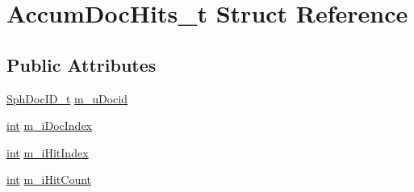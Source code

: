 \hypertarget{structAccumDocHits__t}{\section{Accum\-Doc\-Hits\-\_\-t Struct Reference}
\label{structAccumDocHits__t}
}
\subsection*{Public Attributes}
\begin{DoxyCompactItemize}
\item 
\hyperlink{sphinx_8h_a3176771631c12a9e4897272003e6b447}{Sph\-Doc\-I\-D\-\_\-t} \hyperlink{structAccumDocHits__t_a222780dcbcc7d5fd42bf5196ab47c51f}{m\-\_\-u\-Docid}
\item 
\hyperlink{sphinxexpr_8cpp_a4a26e8f9cb8b736e0c4cbf4d16de985e}{int} \hyperlink{structAccumDocHits__t_a898390d1a67b5cea37b00fde4c4d1f21}{m\-\_\-i\-Doc\-Index}
\item 
\hyperlink{sphinxexpr_8cpp_a4a26e8f9cb8b736e0c4cbf4d16de985e}{int} \hyperlink{structAccumDocHits__t_a79516c4ce5db786fc7dc8ff4786b032d}{m\-\_\-i\-Hit\-Index}
\item 
\hyperlink{sphinxexpr_8cpp_a4a26e8f9cb8b736e0c4cbf4d16de985e}{int} \hyperlink{structAccumDocHits__t_a937f98afc69d1155c9fa0e2ab5e9e195}{m\-\_\-i\-Hit\-Count}
\end{DoxyCompactItemize}



